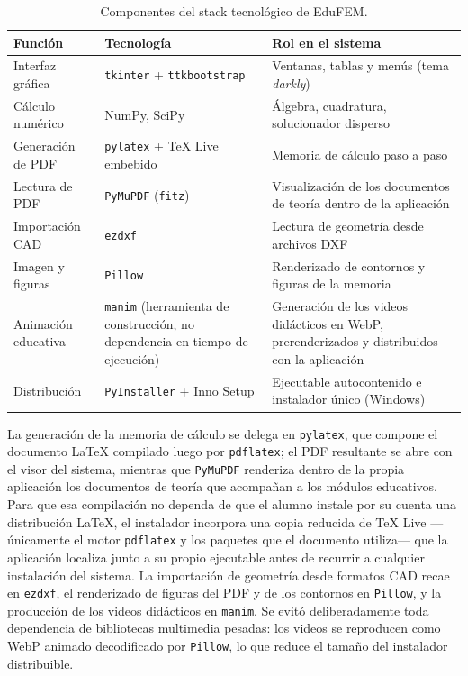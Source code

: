 \begin{table}[H]
\centering
\caption{Componentes del stack tecnológico de EduFEM.}
\label{tab:stack}
\setlength{\tabcolsep}{4pt}
\begin{tabular}{@{}l >{\raggedright\arraybackslash}p{4.0cm} >{\raggedright\arraybackslash}p{6.9cm}@{}}
\toprule
\textbf{Función} & \textbf{Tecnología} & \textbf{Rol en el sistema} \\
\midrule
Interfaz gráfica      & \texttt{tkinter} + \texttt{ttkbootstrap} & Ventanas, tablas y menús (tema \emph{darkly}) \\
Cálculo numérico      & NumPy, SciPy                              & Álgebra, cuadratura, solucionador disperso \\
Generación de PDF     & \texttt{pylatex} + \TeX{} Live embebido    & Memoria de cálculo paso a paso \\
Lectura de PDF        & \texttt{PyMuPDF} (\texttt{fitz})          & Visualización de los documentos de teoría dentro de la aplicación \\
Importación CAD       & \texttt{ezdxf}                            & Lectura de geometría desde archivos DXF \\
Imagen y figuras      & \texttt{Pillow}                           & Renderizado de contornos y figuras de la memoria \\
Animación educativa   & \texttt{manim} (herramienta de construcción, no dependencia en tiempo de ejecución) & Generación de los videos didácticos en WebP, prerenderizados y distribuidos con la aplicación \\
Distribución          & \texttt{PyInstaller} + Inno Setup         & Ejecutable autocontenido e instalador único (Windows) \\
\bottomrule
\end{tabular}
\end{table}

La generación de la memoria de cálculo se delega en \texttt{pylatex}, que compone el documento \LaTeX{} compilado luego por \texttt{pdflatex}; el PDF resultante se abre con el visor del sistema, mientras que \texttt{PyMuPDF} renderiza dentro de la propia aplicación los documentos de teoría que acompañan a los módulos educativos. Para que esa compilación no dependa de que el alumno instale por su cuenta una distribución \LaTeX{}, el instalador incorpora una copia reducida de \TeX{} Live —únicamente el motor \texttt{pdflatex} y los paquetes que el documento utiliza— que la aplicación localiza junto a su propio ejecutable antes de recurrir a cualquier instalación del sistema. La importación de geometría desde formatos CAD recae en \texttt{ezdxf}, el renderizado de figuras del PDF y de los contornos en \texttt{Pillow}, y la producción de los videos didácticos en \texttt{manim}. Se evitó deliberadamente toda dependencia de bibliotecas multimedia pesadas: los videos se reproducen como WebP animado decodificado por \texttt{Pillow}, lo que reduce el tamaño del instalador distribuible.

